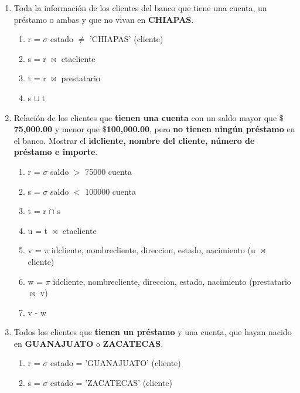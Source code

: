 \documentclass[10pt,letterpaper,fleqn]{article}
\begin{document}
\begin{enumerate}
\begin{enumerate}[a]
            \item Toda la información de los clientes del banco que tiene una cuenta, un préstamo o ambas y que no vivan en \textbf{CHIAPAS}.
            \begin{enumerate}[1]
                \item \textbar \quad r = $\sigma$ estado $\neq$ 'CHIAPAS' (cliente)
                \item \textbar \quad s = r $\bowtie$ ctacliente
                \item \textbar \quad t = r $\bowtie$ prestatario
                \item \textbar \quad s $\cup$ t
            \end{enumerate}
            \item Relación de los clientes que \textbf{tienen una cuenta} con un saldo mayor que $\$$ \textbf{75,000.00} y menor que $\$$\textbf{100,000.00}, pero \textbf{no tienen ningún préstamo} en el banco. Mostrar el \textbf{idcliente, nombre del cliente, número de préstamo e importe}.
            \begin{enumerate}[1]
                \item \textbar \quad r = $\sigma$ saldo $>$ 75000 cuenta
                \item \textbar \quad s = $\sigma$ saldo $<$ 100000 cuenta
                \item \textbar \quad t = r $\cap$ s
                \item \textbar \quad u = t $\bowtie$ ctacliente
                \item \textbar \quad v = $\pi$ idcliente, nombrecliente, direccion, estado, nacimiento (u $\bowtie$ cliente)
                \item \textbar \quad w = $\pi$ idcliente, nombrecliente, direccion, estado, nacimiento (prestatario $\bowtie$ v)
                \item \textbar \quad v - w
            \end{enumerate}
            \item Todos los clientes que \textbf{tienen un préstamo} y una cuenta, que hayan nacido en \textbf{GUANAJUATO} o \textbf{ZACATECAS}.
            \begin{enumerate}[1]
                \item \textbar \quad r = $\sigma$ estado = 'GUANAJUATO' (cliente)
                \item \textbar \quad s = $\sigma$ estado = 'ZACATECAS' (cliente)

\end{enumerate}
\end{enumerate}
\end{enumerate}
\end{document}
